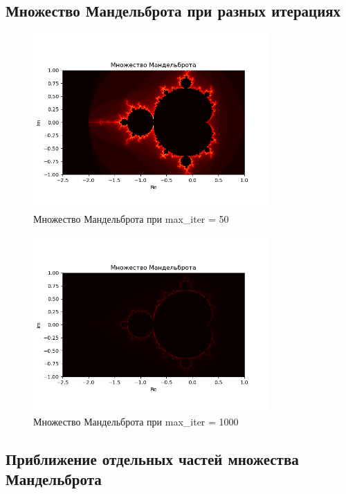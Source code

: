 \documentclass{article}
\begin{document}
	\subsection{Множество Мандельброта при разных итерациях}
	\begin{figure}[H]
		\centering
		\includegraphics[width=0.8\textwidth]{images/mandelbrot_iter50.png}
		\caption{Множество Мандельброта при max\_iter = 50}
		\label{fig:mandelbrot50}
	\end{figure}
	
	\begin{figure}[H]
		\centering
		\includegraphics[width=0.8\textwidth]{images/mandelbrot_iter1000.png}
		\caption{Множество Мандельброта при max\_iter = 1000}
		\label{fig:mandelbrot1000}
	\end{figure}
	
	\subsection{Приближение отдельных частей множества Мандельброта}
	
\end{document}
